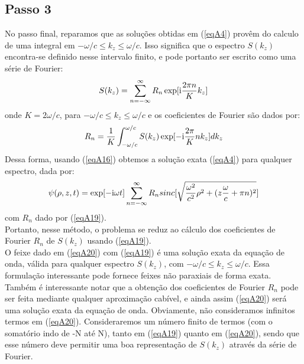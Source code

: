 \subsection{Passo 3}
No passo final, reparamos que as soluções obtidas em (\ref{eqA4}) provêm do calculo de uma integral em $-\omega/c\leq k_z\leq\omega/c$. Isso significa que o espectro $S(k_z)$ encontra-se definido nesse intervalo finito, e pode portanto ser escrito como uma série de Fourier:
\begin{equation}\label{eqA18}
  S(k_{z})= \sum\limits_{n=-\infty}^{\infty}R_n \exp[{\rm i}\frac{2\pi n}{K}k_{z}] 
\end{equation}
onde $K=2\omega/c$, para $-\omega/c\leq k_z\leq\omega/c$ e os coeficientes de Fourier são dados por:
\begin{equation}\label{eqA19}
  R_n=\frac{1}{K}\int_{-\omega/c}^{\omega/c} S(k_z)\exp[-{\rm i}\frac{2\pi}{K}n k_z]dk_z
\end{equation}
Dessa forma, usando (\ref{eqA16}) obtemos a solução exata (\ref{eqA4}) para qualquer espectro, dada por:
\begin{equation}\label{eqA20}
  \psi(\rho,z,t)= \exp[-{\rm i}\omega t]\sum\limits_{n=-\infty}^{\infty}R_n sinc[\sqrt{\frac{\omega^2}{c^2}\rho^2+(z\frac{\omega}{c}+\pi n)^2}]  
\end{equation}
com $R_n$ dado por (\ref{eqA19}).\\
Portanto, nesse método, o problema se reduz ao cálculo dos coeficientes de Fourier $R_n$ de $S(k_z)$ usando (\ref{eqA19}).\\
O feixe dado em (\ref{eqA20}) com (\ref{eqA19}) é uma solução exata da equação de onda, válida para qualquer espectro $S(k_z)$, com $-\omega/c\leq k_z\leq\omega/c$. Essa formula\c{c}\~ao interessante pode fornece feixes n\~ao paraxiais de forma exata.\\
Também \'e interessante notar que a obtenção dos coeficientes de Fourier $R_n$ pode ser feita mediante  qualquer aproximação cabível, e ainda assim (\ref{eqA20}) será uma solução exata da equação de onda. Obviamente, n\~ao consideramos infinitos termos em (\ref{eqA20}). Consideraremos um número finito de termos (com o somatório indo de -N até N), tanto em (\ref{eqA19}) quanto em (\ref{eqA20}), sendo que esse número deve permitir uma boa representa\c{c}\~ao de $S(k_z)$ através da série de Fourier. 
